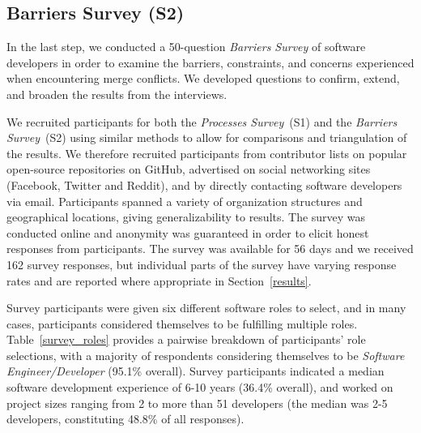 \subsection{Barriers Survey (S2)}\label{perceptions_survey}

In the last step, we conducted a 50-question \textit{Barriers Survey} of software developers in order to examine the barriers, constraints, and concerns experienced when encountering merge conflicts.
We developed questions to confirm, extend, and broaden the results from the interviews.

\renewcommand*{\thefootnote}{\arabic{footnote}}
We recruited participants for both the \textit{Processes Survey}~(S1) and the \textit{Barriers Survey}~(S2) using similar methods to allow for comparisons and triangulation of the results.
We therefore recruited participants from contributor lists on popular open-source repositories on GitHub, advertised on social networking sites (Facebook, Twitter and Reddit), and by directly contacting software developers via email. 
Participants spanned a variety of organization structures and geographical locations, giving generalizability to results.
The survey was conducted online and anonymity was guaranteed in order to elicit honest responses from participants.
The survey was available for 56 days and we received 162 survey responses, but individual parts of the survey have varying response rates and are reported where appropriate in Section~\ref{results}. 

Survey participants were given six different software roles to select, and in many cases, participants considered themselves to be fulfilling multiple roles. 
Table~\ref{survey_roles} provides a pairwise breakdown of participants' role selections, with a majority of respondents considering themselves to be \textit{Software Engineer/Developer} (95.1\% overall).
Survey participants indicated a median software development experience of 6-10 years (36.4\% overall), and worked on project sizes ranging from 2 to more than 51 developers (the median was 2-5 developers, constituting 48.8\% of all responses).

